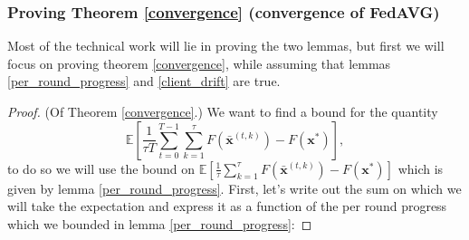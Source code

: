\subsubsection*{Proving Theorem \ref{convergence} (convergence of FedAVG)}

Most of the technical work will lie in proving the two lemmas, but first we will focus on proving theorem \ref{convergence}, while assuming that lemmas \ref{per_round_progress} and \ref{client_drift} are true.

\begin{proof}
    (Of Theorem \ref{convergence}.) We want to find a bound for the quantity \[ \mathbb{E} \left[ \frac{1}{\tau T} \sum_{t=0}^{T-1}\sum_{k=1}^{\tau} F(\bar{\bm{x}}^{(t,k)}) - F(\bm{x}^*)\right], \]
    to do so we will use the bound on $\mathbb{E} \left[ \frac{1}{\tau} \sum_{k=1}^{\tau} F(\bar{\bm{x}}^{(t,k)}) - F(\bm{x}^*)\right]$ which is given by lemma \ref{per_round_progress}. First, let's write out the sum on which we will take the expectation and express it as a function of the per round progress which we bounded in lemma \ref{per_round_progress}:


\end{proof}
